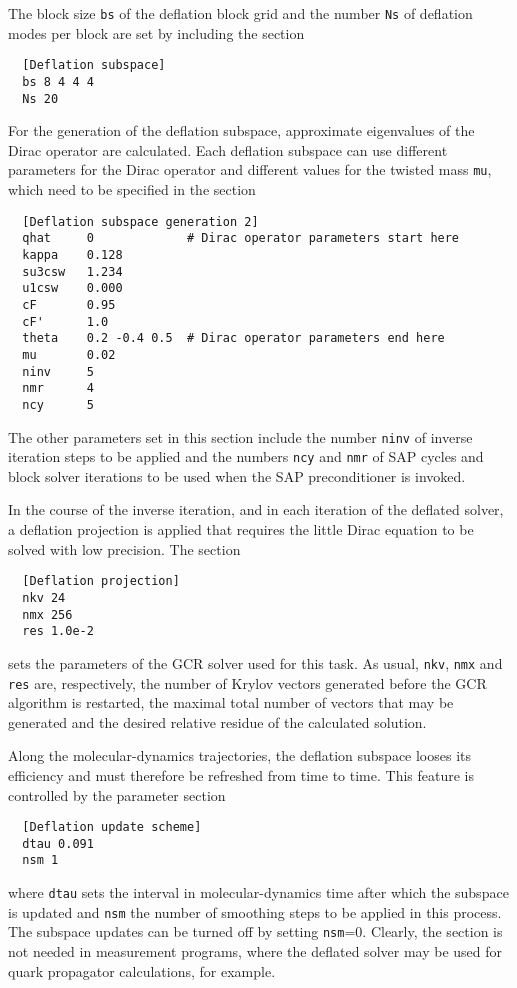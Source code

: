 \documentclass[11pt,fleqn]{article}
\begin{document}
The block size \texttt{bs} of the deflation block grid and the number
\texttt{Ns} of deflation modes per block are set by including the section
%
\begin{verbatim}
  [Deflation subspace]
  bs 8 4 4 4
  Ns 20
\end{verbatim}

For the generation of the deflation subspace, approximate eigenvalues of the
Dirac operator are calculated. Each deflation subspace can use different
parameters for the Dirac operator and different values for the twisted mass
\texttt{mu}, which need to be specified in the section
%
\begin{verbatim}
  [Deflation subspace generation 2]
  qhat     0             # Dirac operator parameters start here
  kappa    0.128
  su3csw   1.234
  u1csw    0.000
  cF       0.95
  cF'      1.0
  theta    0.2 -0.4 0.5  # Dirac operator parameters end here
  mu       0.02
  ninv     5
  nmr      4
  ncy      5
\end{verbatim}
%
The other parameters set in this section include the number \texttt{ninv} of
inverse iteration steps to be applied and the numbers \texttt{ncy} and
\texttt{nmr} of SAP cycles and block solver iterations to be used when the SAP
preconditioner is invoked.

In the course of the inverse iteration, and in each iteration of the deflated
solver, a deflation projection is applied that requires the little Dirac
equation to be solved with low precision. The section
%
\begin{verbatim}
  [Deflation projection]
  nkv 24
  nmx 256
  res 1.0e-2
\end{verbatim}
%
sets the parameters of the GCR solver used for this task. As usual,
\texttt{nkv}, \texttt{nmx} and \texttt{res} are, respectively, the number of
Krylov vectors generated before the GCR algorithm is restarted, the maximal
total number of vectors that may be generated and the desired relative residue
of the calculated solution.

Along the molecular-dynamics trajectories, the deflation subspace looses its
efficiency and must therefore be refreshed from time to time. This feature is
controlled by the parameter section
%
\begin{verbatim}
  [Deflation update scheme]
  dtau 0.091
  nsm 1
\end{verbatim}
%
where \texttt{dtau} sets the interval in molecular-dynamics time after which the
subspace is updated and \texttt{nsm} the number of smoothing steps to be applied
in this process. The subspace updates can be turned off by setting
\texttt{nsm}=0. Clearly, the section is not needed in measurement programs,
where the deflated solver may be used for quark propagator calculations, for
example.
\end{document}
